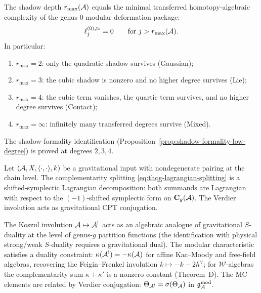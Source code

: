 \begin{theorem}\ClaimStatusProvedHere
\label{thm:thqg-g2-complexity}
The shadow depth $r_{\max}(\mathcal{A})$ equals the minimal
transferred homotopy-algebraic complexity of the genus-$0$
modular deformation package:
\[
\ell_j^{(0),\mathrm{tr}} = 0 \qquad \text{for } j > r_{\max}(\mathcal{A}).
\]
In particular:
\begin{enumerate}[label=\textup{(\roman*)}]
\item $r_{\max} = 2$: only the quadratic shadow survives (Gaussian);
\item $r_{\max} = 3$: the cubic shadow is nonzero and no higher degree survives (Lie);
\item $r_{\max} = 4$: the cubic term vanishes, the quartic term survives, and no higher degree survives (Contact);
\item $r_{\max} = \infty$: infinitely many transferred degrees survive (Mixed).
\end{enumerate}
The shadow-formality identification
(Proposition~\ref{prop:shadow-formality-low-degree}) is proved at degrees $2,3,4$.
\end{theorem}

\begin{theorem}\ClaimStatusProvedHere
\label{thm:thqg-g3-polarization}
Let $(\mathcal{A}, X, \langle\cdot,\cdot\rangle, k)$ be a gravitational input with
nondegenerate pairing at the chain level. The complementarity splitting
\eqref{eq:thqg-lagrangian-splitting} is a shifted-symplectic Lagrangian
decomposition: both summands are Lagrangian with respect to the
$(-1)$-shifted symplectic form on $\mathbf{C}_g(\mathcal{A})$. The Verdier
involution acts as gravitational CPT conjugation.
\end{theorem}

\begin{theorem}\ClaimStatusProvedHere
\label{thm:thqg-g4-s-duality}
The Koszul involution $\mathcal{A} \mapsto \mathcal{A}^!$ acts as an algebraic
analogue of gravitational $S$-duality
at the level of genus-$g$ partition functions
\textup{(}the identification with physical strong/weak $S$-duality
requires a gravitational dual\textup{)}. The modular characteristic
satisfies a duality constraint: $\kappa(\mathcal{A}^!) = -\kappa(\mathcal{A})$ for affine
Kac--Moody and free-field algebras, recovering the Feigin--Frenkel involution
$k \mapsto -k - 2h^\vee$; for $\mathcal{W}$-algebras the complementarity sum
$\kappa + \kappa'$ is a nonzero constant (Theorem~D). The MC elements are
related by Verdier conjugation:
$\Theta_{\mathcal{A}^!} = \sigma(\Theta_{\mathcal{A}})$ in $\mathfrak{g}_{\mathcal{A}}^{\mathrm{mod}}$.
\end{theorem}


